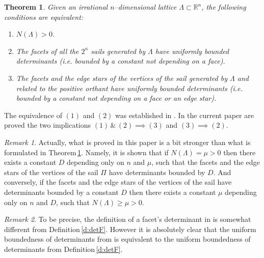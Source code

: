 \documentclass[11pt]{article}
\theoremstyle{definition}
\theoremstyle{remark}
\newtheorem{remark}{Remark}
\theoremstyle{plain}
\newtheorem{theorem}{Theorem}
\renewcommand{\geq}{\geqslant}
\newcommand{\sail}{\Pi}
\newcommand{\La}{\Lambda}
\begin{document}
  \begin{theorem} \label{t:the_main_one}
    Given an irrational $n$--dimensional lattice $\La\subset\mathbb R^n$, the following
    conditions are equivalent:

    \begin{enumerate}
      \item $N(\La)>0$.

      \item The facets of all the $2^n$ sails generated by $\La$ have uniformly bounded
      determinants (i.e. bounded by a constant not depending on a face).

      \item The facets and the edge stars of the vertices of the sail generated by $\La$ and
      related to the positive orthant have uniformly bounded determinants (i.e. bounded by a
      constant not depending on a face or an edge star).
    \end{enumerate}
  \end{theorem}

  The equivalence of $(1)$ and $(2)$ was established in \cite{german_norm_minima_I}. In the
  current paper are proved the two implications $(1)\,\&\,(2)\implies(3)$ and
  $(3)\implies (2)$.

  \begin{remark}
    Actually, what is proved in this paper is a bit stronger than what is formulated in
    Theorem\,\ref{t:the_main_one}. Namely, it is shown that if $N(\La)=\mu>0$ then there
    exists a constant $D$ depending only on $n$ and $\mu$, such that the facets and the edge
    stars of the vertices of the sail $\sail$ have determinants bounded by $D$. And
    conversely, if the facets and the edge stars of the vertices of the sail have
    determinants bounded by a constant $D$ then there exists a constant $\mu$ depending only
    on $n$ and $D$, such that $N(\La)\geq\mu>0$.
  \end{remark}

  \begin{remark}
    To be precise, the definition of a facet's determinant in \cite{german_norm_minima_I} is
    somewhat different from Definition\,\ref{d:detF}. However it is absolutely clear that the
    uniform boundedness of determinants from \cite{german_norm_minima_I} is equivalent to the
    uniform boundedness of determinants from Definition\,\ref{d:detF}.
  \end{remark}
\end{document}
